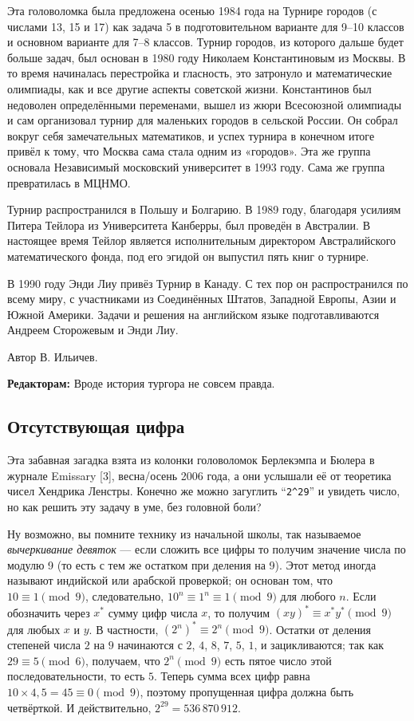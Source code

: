 Эта головоломка была предложена осенью 1984 года на Турнире городов (с числами 13, 15 и 17) как задача 5 в подготовительном варианте для 9--10 классов и основном варианте для 7--8 классов.
Турнир городов, из которого дальше будет больше задач, был основан в 1980 году Николаем Константиновым из Москвы.
В то время начиналась перестройка и гласность, это затронуло и математические олимпиады, как и все другие аспекты советской жизни.
Константинов был недоволен определёнными переменами, вышел из жюри Всесоюзной олимпиады и сам организовал турнир для маленьких городов в сельской России.
Он собрал вокруг себя замечательных математиков, и успех турнира в конечном итоге привёл к тому, что Москва сама стала одним из «городов».
Эта же группа основала Независимый московский университет в 1993 году.
Сама же группа превратилась в МЦНМО.

Турнир распространился в Польшу и Болгарию.
В 1989 году, благодаря усилиям Питера Тейлора из Университета Канберры, был проведён в Австралии.
В настоящее время Тейлор является исполнительным директором Австралийского математического фонда, под его эгидой он выпустил пять книг о турнире.

В 1990 году Энди Лиу привёз Турнир в Канаду.
С тех пор он распространился по всему миру, с участниками из Соединённых Штатов, Западной Европы, Азии и Южной Америки.
Задачи и решения на английском языке подготавливаются Андреем Сторожевым и Энди Лиу.

\begin{addedbytheeditors}
Автор В. Ильичев.

\textbf{Редакторам:} Вроде история тургора не совсем правда.
\end{addedbytheeditors}

\subsection*{Отсутствующая цифра}

Эта забавная загадка взята из колонки головоломок Берлекэмпа и Бюлера в журнале Emissary [3], весна/осень 2006 года,
а они услышали её от теоретика чисел Хендрика Ленстры.
Конечно же можно загуглить ``\texttt{2\^{}29}'' и увидеть число, но как решить эту задачу в уме, без головной боли?

Ну возможно, вы помните технику из начальной школы, так называемое \emph{вычеркивание девяток} --- если сложить все цифры то получим значение числа по модулю 9 (то есть  с тем же остатком при деления на 9).
Этот метод иногда называют индийской или арабской проверкой;
он основан том, что $10 \equiv 1 \pmod 9$, следовательно, $10^n \equiv 1^n \equiv 1 \pmod 9$ для любого $n$.
Если обозначить через $x^*$ сумму цифр числа $x$, то получим $(xy)^* \equiv x^* y^* \pmod 9$ для любых $x$ и $y$.
В частности, $(2^n)^* \equiv 2^n \pmod 9$.
Остатки от деления степеней числа $2$ на $9$ начинаются с $2$, $4$, $8$, $7$, $5$, $1$, и зацикливаются;
так как $29 \equiv 5 \pmod 6$, получаем, что $2^n \pmod 9$ есть пятое число этой последовательности, то есть $5$.
Теперь сумма всех цифр равна $10 \times 4{,}5 = 45 \equiv 0 \pmod 9$, поэтому пропущенная цифра должна быть четвёрткой.
И действительно, $2^{29} = 536\,870\,912$.

